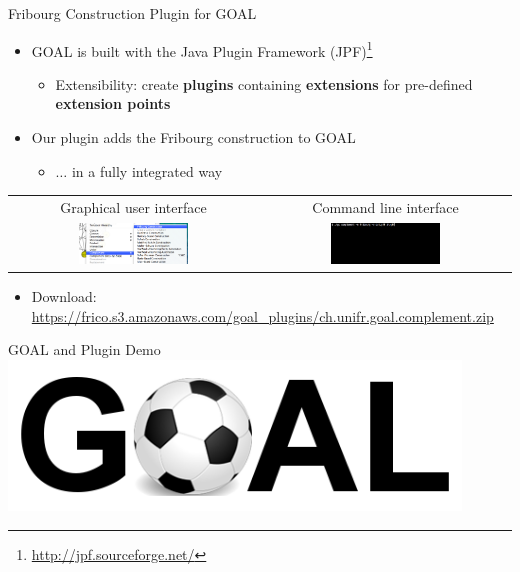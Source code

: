 \documentclass[12pt,handout]{beamer}
\newcommand{\fat}[1]{\textbf{#1}}
\begin{document}
\begin{frame}{Fribourg Construction Plugin for GOAL}
\begin{itemize}
\item GOAL is built with the Java Plugin Framework (JPF)\footnote{\scriptsize\url{http://jpf.sourceforge.net/}}
  \begin{itemize}
  \item Extensibility: create \fat{plugins} containing \fat{extensions} for pre-defined \fat{extension points}
  \end{itemize}
\item Our plugin adds the Fribourg construction to GOAL
  \begin{itemize}
  \item $\dots$ in a fully integrated way
  \end{itemize}
\end{itemize}
\centering
\begin{tabular}{cc}
\footnotesize Graphical user interface & \footnotesize Command line interface \\
\includegraphics[width=0.46\textwidth]{figures/plugin_gui.png} &
\includegraphics[width=0.46\textwidth]{figures/plugin_cl.png}
\end{tabular}
\begin{itemize}
\item Download: \url{https://frico.s3.amazonaws.com/goal_plugins/ch.unifr.goal.complement.zip}
\end{itemize}
\end{frame}

\begin{frame}{GOAL and Plugin Demo}
\vspace{0.5cm}
\centering
\includegraphics[width=0.9\textwidth]{figures/goal_logo.png}
\end{frame}
\end{document}
